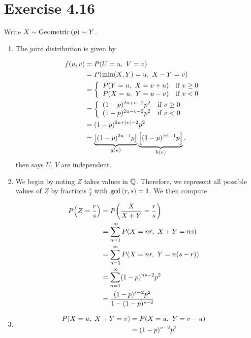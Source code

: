 \documentclass[12pt,letterpaper,reqno]{amsart}
\numberwithin{equation}{subsection}
\begin{document}
\newpage
\section{Exercise 4.16}

Write $X \sim \operatorname{Geometric}\left( {p} \right) \sim Y$.

\begin{enumerate}[label=(\alph*),leftmargin=*]
    \item The joint distribution is given by
    
    \begin{align*}
        {f}\! \left( {u,v} \right) &= {P}\! \left( {U = u, \ V = v} \right) \\
        &= {P}\! \left( {{\min}\! \left( {X, Y} \right) = u, \ X-Y = v} \right) \\
        &= \left\{ \begin{array}{cl}
            {P}\! \left( {Y=u, \ X = v+u} \right) & \mbox{if $v \geq 0$}  \\
            {P}\! \left( {X=u, \ Y = u-v} \right) & \mbox{if $v < 0$} 
        \end{array} \right. \\
        &= \left\{ \begin{array}{cl}
            (1-p)^{2u+v-2}p^2 & \mbox{if $v \geq 0$}  \\
            (1-p)^{2u-v-2}p^2 & \mbox{if $v < 0$} 
        \end{array} \right. \\
        &= (1-p)^{2u + \left\lvert{v}\right\rvert-2} p^2 \\
        &= \underbrace{\left[ (1-p)^{2u-1}p \right]}_{g(u)} \underbrace{\left[ (1-p)^{\left\lvert{v}\right\rvert-1}p \right]}_{h(v)}.
    \end{align*}
    \cite[Lemma 4.2.7 on page 153]{Berger-Casella} then says $U$, $V$ are independent.
    
    \item We begin by noting $Z$ takes values in $\mathbb{Q}$. Therefore, we represent all possible values of $Z$ by fractions $\frac{r}{s}$ with $\gcd\left( {r,s} \right) = 1$. We then compute
    
    \begin{align*}
        {P}\! \left( {Z = \frac{r}{s}} \right)
        &= {P}\! \left( {\frac{X}{X+Y} = \frac{r}{s}} \right) \\
        &= \sum_{n=1}^{\infty} {P}\! \left( {X = nr, \ X+Y = ns} \right) \\
        &= \sum_{n=1}^{\infty} {P}\! \left( {X = nr, \ Y = n(s-r)} \right) \\
        &= \sum_{n=1}^{\infty} (1-p)^{ns-2}p^2 \\
        &= \frac{(1-p)^{s-2}p^2}{1-(1-p)^{s-2}}
    \end{align*}
    
    \item
    
    \begin{align*}
        {P}\! \left( {X = u, \ X+Y = v} \right) &= {P}\! \left( {X = u, \ Y = v-u} \right) \\
        &= (1-p)^{v-2} p^2
    \end{align*}
\end{enumerate}
\end{document}
